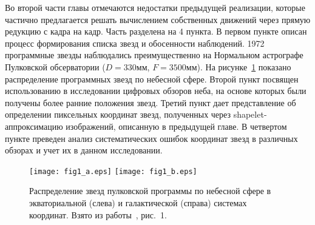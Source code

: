 Во второй части главы отмечаются недостатки предыдущей реализации, которые частично предлагается решать вычислением собственных движений через прямую редукцию с кадра на кадр.  Часть разделена на 4 пункта. В первом пункте описан процесс формирования списка звезд и обосенности наблюдений. 1972 программные звезды наблюдались преимущественно на Нормальном астрографе Пулковской обсерватории ($D=330 мм$, $F=3500 мм$). На рисунке~\ref{fig:15alloc} показано распределение программных звезд по небесной сфере. Второй пункт посвящен использованию в исследовании цифровых обзоров неба, на основе которых были получены более ранние положения звезд. Третий пункт дает представление об определении пиксельных координат звезд, полученных через shapelet-аппроксимацию изображений, описанную в предыдущей главе. В четвертом пункте преведен анализ систематических ошибок координат звезд в различных обзорах и учет их в данном исследовании.
\begin{figure}[h]
\centering
\texttt{[image: fig1\_a.eps]}
\texttt{[image: fig1\_b.eps]}
\caption{Распределение звезд пулковской программы по небесной сфере в экваториальной (слева) и галактической (справа) системах координат. Взято из работы~\cite{2015AstL...41..833K}, рис.~1.}
 \label{fig:15alloc}
\end{figure}

